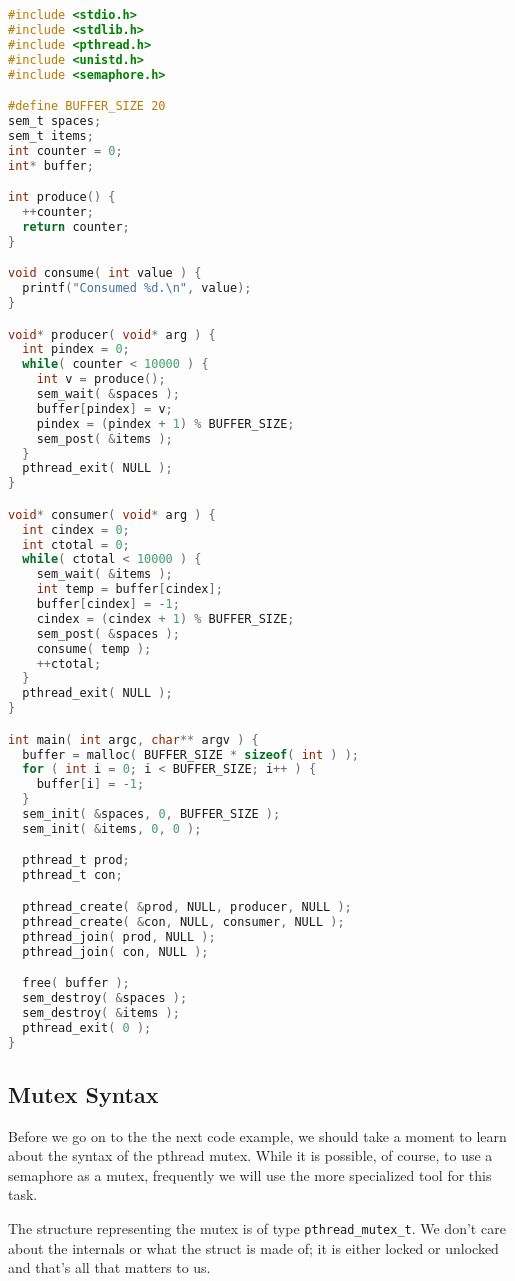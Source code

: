 \begin{lstlisting}[language=C]
#include <stdio.h>
#include <stdlib.h>
#include <pthread.h>
#include <unistd.h>
#include <semaphore.h>

#define BUFFER_SIZE 20
sem_t spaces;
sem_t items;
int counter = 0;
int* buffer;

int produce() {
  ++counter;
  return counter;
} 

void consume( int value ) {
  printf("Consumed %d.\n", value);
}

void* producer( void* arg ) {
  int pindex = 0;
  while( counter < 10000 ) {
    int v = produce();
    sem_wait( &spaces );
    buffer[pindex] = v;
    pindex = (pindex + 1) % BUFFER_SIZE;
    sem_post( &items );
  }
  pthread_exit( NULL );
}

void* consumer( void* arg ) {
  int cindex = 0;
  int ctotal = 0;
  while( ctotal < 10000 ) {
    sem_wait( &items );
    int temp = buffer[cindex];
    buffer[cindex] = -1;
    cindex = (cindex + 1) % BUFFER_SIZE;
    sem_post( &spaces );
    consume( temp );
    ++ctotal;
  }
  pthread_exit( NULL );
}

int main( int argc, char** argv ) {
  buffer = malloc( BUFFER_SIZE * sizeof( int ) );
  for ( int i = 0; i < BUFFER_SIZE; i++ ) {
    buffer[i] = -1;
  }  
  sem_init( &spaces, 0, BUFFER_SIZE );
  sem_init( &items, 0, 0 );

  pthread_t prod;
  pthread_t con;

  pthread_create( &prod, NULL, producer, NULL );
  pthread_create( &con, NULL, consumer, NULL );
  pthread_join( prod, NULL );
  pthread_join( con, NULL );

  free( buffer );
  sem_destroy( &spaces );
  sem_destroy( &items );
  pthread_exit( 0 );
}
\end{lstlisting}

\subsection*{Mutex Syntax}
Before we go on to the the next code example, we should take a moment to learn about the syntax of the pthread mutex. While it is possible, of course, to use a semaphore as a mutex, frequently we will use the more specialized tool for this task.

The structure representing the mutex is of type \texttt{pthread\_mutex\_t}. We don't care about the internals or what the struct is made of; it is either locked or unlocked and that's all that matters to us.

